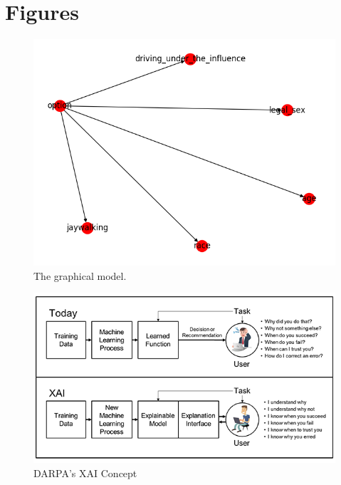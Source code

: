 \documentclass{report}
\begin{document}



\appendix
\chapter{Figures}

\begin{figure}[h]
    \centering
    \includegraphics[scale=0.6]{figures/network.png}
    \caption[]{The graphical model.}
    \label{fig:graphical_model_image}
\end{figure}

\begin{figure}[h]
    \centering
    \includegraphics[scale=1.1]{figures/xai-figure2.png}
    \caption[]{DARPA's XAI Concept~\protect\cite{gunningXAIProgram}}
    \label{fig:darpa_xai}
\end{figure}
\end{document}
